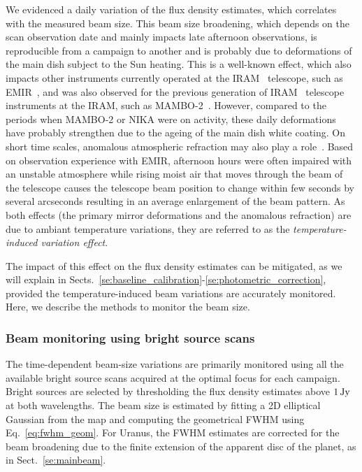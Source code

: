 We evidenced a daily variation of the flux density estimates,
which correlates with the measured beam size.
This beam size broadening, which depends on the
scan observation date and mainly impacts late
afternoon observations, is reproducible from a campaign to another and 
is probably due to deformations of the main dish subject to the Sun
heating. This is a well-known effect, which also impacts other
instruments currently operated at the IRAM \trentemetre\ telescope, such as
EMIR~\citep{Carter2012}, and was also observed for the previous generation of
IRAM \trentemetre\ telescope instruments at the IRAM, such as
MAMBO-2~\citep{Kreysa1999}. However,
compared to the periods when MAMBO-2 or NIKA were on activity, these
daily deformations have probably strengthen due to the ageing of the
main dish white coating. On short time scales, anomalous atmospheric
refraction
may also play a role~\citep{Altenhoff1987}. Based on observation
experience with EMIR, afternoon hours were often impaired with an
unstable atmosphere while rising moist air that
moves through the beam of the telescope causes the telescope beam
position to change within few seconds by several arcseconds {\lp resulting
in an average enlargement of the beam pattern. As both effects (the
primary mirror deformations and the anomalous refraction) are due to
ambiant temperature variations, they are referred to as
the \emph{temperature-induced variation effect}.}

The impact of this effect on the flux density estimates can be
mitigated, as we will explain in
Sects.~\ref{se:baseline_calibration}-\ref{se:photometric_correction},
provided the temperature-induced beam variations are accurately
monitored. Here, we describe the methods to monitor the beam size.   


\subsubsection{Beam monitoring using bright source scans}
\label{se:beam_monitoring_otf}

The time-dependent beam-size variations are primarily monitored using
all the available bright source scans acquired at the optimal focus
for each campaign. Bright sources are selected by thresholding the
flux density estimates above $1\,\rm{Jy}$ at both wavelengths.
The beam size is estimated by fitting a 2D elliptical Gaussian from the map {\lp
and computing the geometrical FWHM using Eq.~\ref{eq:fwhm_geom}.}
For Uranus, the FWHM estimates are corrected for the beam broadening due
to the finite extension of the apparent disc of the planet, as in Sect.~\ref{se:mainbeam}. 

